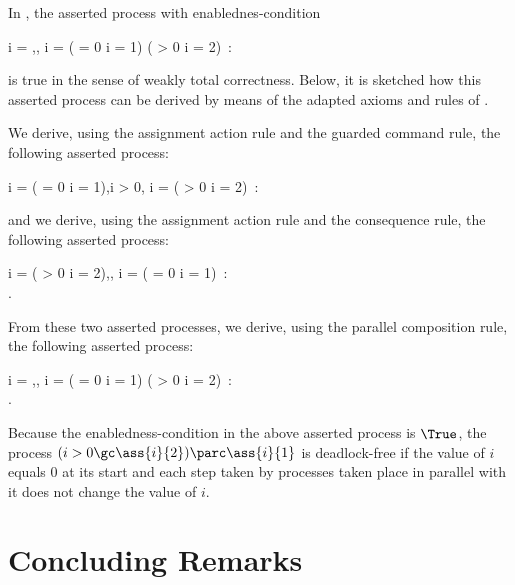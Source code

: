 \documentclass[runningheads]{llncs}
\begin{document}
In \RG, the asserted process with enablednes-condition
\begin{ldispl}
\langle 
 i = ,\True, 
 i =  \Lor ( = 0 \Land i = 1) \Lor
                      ( > 0 \Land i = 2)\, \rangle : 
\qquad \\ \hfill
{}
\end{ldispl}%
is true in the sense of weakly total correctness.
Below, it is sketched how this asserted process can be derived by means 
of the adapted axioms and rules of \RG.

We derive, using the assignment action rule and the guarded command 
rule, the following asserted process:
\begin{ldispl}
\langle i =  \Lor ( = 0 \Land i = 1),i > 0,
        i =  \Lor ( > 0 \Land i = 2)\, \rangle :
\qquad \\ \hfill
{}
\end{ldispl}%
and we derive, using the assignment action rule and the consequence 
rule, the following asserted process:
\begin{ldispl}
\langle i =  \Lor ( > 0 \Land i = 2),\True,
        i =  \Lor ( = 0 \Land i = 1)\, \rangle :
\phantom{\,.} \qquad \\ \hfill
{}\;.
\end{ldispl}%
From these two asserted processes, we derive, using the parallel 
composition rule, the following asserted process:
\begin{ldispl}
\langle 
 i = ,\True, 
 i =  \Lor ( = 0 \Land i = 1) \Lor
                      ( > 0 \Land i = 2)\, \rangle : 
\phantom{\,.} \qquad \\ \hfill
{}\;.
\end{ldispl}%
Because the enabledness-condition in the above asserted process is 
$\True$, the process $(i > 0 \gc \ass{i}{2}) \parc \ass{i}{1}$ is 
deadlock-free if the value of $i$ equals $0$ at its start and each step 
taken by processes taken place in parallel with it does not change the 
value of $i$.

\section{Concluding Remarks}
\label{sect-conclusions}
\end{document}
